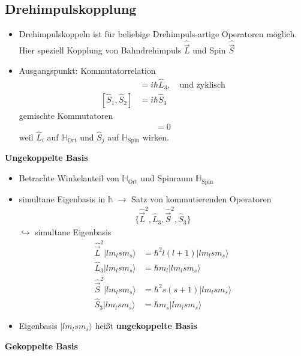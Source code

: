 \documentclass[10pt,article,colorback,accentcolor=tud9d]{scrartcl}
\begin{document}
\subsection{Drehimpulskopplung}
\begin{itemize}
	\item Drehimpulskoppeln ist für beliebige Drehimpuls-artige Operatoren möglich. Hier speziell Kopplung von Bahndrehimpuls $\hat{\vec{L}}$ und Spin $\hat{\vec{S}}$
  \item Ausgangspunkt: Kommutatorrelation
    \begin{align}
    [\hat{L}_1,\hat{L}_2]&=i\hbar\hat{L}_3,\quad\text{und zyklisch}\\
    [\hat{S}_1,\hat{S}_2]&=i\hbar\hat{S}_3
    \end{align}
    gemischte Kommutatoren
    \begin{align}
    [\hat{L}_i,\hat{S}_j]=0
    \end{align}
    weil $\hat{L}_i$ auf $\mathbb{H}_\text{Ort}$ und $\hat{S}_j$ auf $\mathbb{H}_\text{Spin}$ wirken.
\end{itemize}
    \textbf{Ungekoppelte Basis}
\begin{itemize}
  \item Betrachte Winkelanteil von $\mathbb{H}_\text{Ort}$ und Spinraum $\mathbb{H}_\text{Spin}$
  \item simultane Eigenbasis in $\mathbb{h}$ $\rightarrow$ Satz von kommutierenden Operatoren
    \begin{align}
    \{\hat{\vec{L}}^2,\hat{L}_3,\hat{\vec{S}}^2,\hat{S}_3\}
    \end{align}
    $\hookrightarrow$ simultane Eigenbasis
    \begin{align}
    \hat{\vec{L}}^2|lm_lsm_s\rangle&=\hbar^2 l(l+1)|lm_lsm_s\rangle\\
     \hat{L}_3|lm_lsm_s\rangle&=\hbar m_l|lm_lsm_s\rangle\\
    \hat{\vec{S}}^2|lm_lsm_s\rangle&=\hbar^2 s(s+1)|lm_lsm_s\rangle\\
     \hat{S}_3|lm_lsm_s\rangle&=\hbar m_s|lm_lsm_s\rangle
    \end{align}
  \item Eigenbasis $|lm_lsm_s\rangle$ heißt \textbf{ungekoppelte Basis}
\end{itemize}
\textbf{Gekoppelte Basis}
\end{document}
